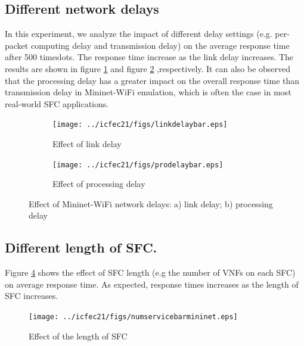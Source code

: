 \subsection{Different network delays}
\label{sec:mininetwifinetworkdelays}
In this experiment, we analyze the impact of different delay settings (e.g. per-packet computing delay and transmission delay) on the average response time after 500 timeslots. The response time increase as the link delay increases. The results are shown in figure \ref{fig:link delay bar} and figure \ref{fig:processing delay bar} ,respectively. It can also be observed that the processing delay has a greater impact on the overall response time than transmission delay in Mininet-WiFi emulation, which is often the case in most real-world SFC applications.
\begin{figure}[t]
	\centering
	\begin{subfigure}[b]{.45\textwidth}
		\centering
		\texttt{[image: ../icfec21/figs/linkdelaybar.eps]}
		
		\caption{Effect of link delay}
		\label{fig:link delay bar}
	\end{subfigure}
	\begin{subfigure}[b]{.45\textwidth}
		\centering
		\texttt{[image: ../icfec21/figs/prodelaybar.eps]}
		
		\caption{Effect of processing delay}
		\label{fig:processing delay bar}
	\end{subfigure}
		\vspace{\baselineskip}
	\caption{Effect of Mininet-WiFi network delays: a) link delay; b) processing delay}
	\label{fig:environparameter-mininet}
\end{figure}
\subsection{Different length of SFC.}
\label{sec:mininetwifiSFClength}
Figure \ref{fig:num service mininet bar} shows the effect of SFC length (e.g the number of VNFs on each SFC) on average response time. As expected, response times increases as the length of SFC increases. 
\begin{figure}
	\centering
	\texttt{[image: ../icfec21/figs/numservicebarmininet.eps]}
	\vspace{\baselineskip}
	\caption{Effect of the length of SFC}
	\label{fig:num service mininet bar}
\end{figure}

